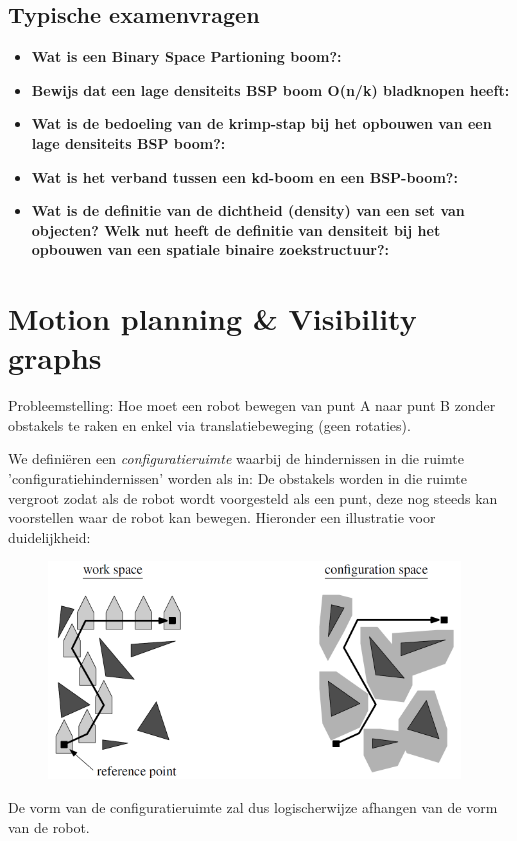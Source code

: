 \documentclass[12pt,a4paper]{article}
\begin{document}
	
	
	\subsection{Typische examenvragen}
	\begin{itemize}
		\item \textbf{Wat is een Binary Space Partioning boom?:}\\
		\item \textbf{Bewijs dat een lage densiteits BSP boom O(n/k) bladknopen heeft:}\\
		\item \textbf{Wat is de bedoeling van de krimp-stap bij het opbouwen van een lage densiteits BSP boom?:}\\
		\item \textbf{Wat is het verband tussen een kd-boom en een BSP-boom?:}\\
		\item \textbf{Wat is de definitie van de dichtheid (density) van een set van objecten? Welk nut heeft de definitie van densiteit bij het opbouwen van een spatiale binaire zoekstructuur?:}\\
	\end{itemize}
	
	
	\section{Motion planning \& Visibility graphs}
	Probleemstelling: Hoe moet een robot bewegen van punt A naar punt B zonder obstakels te raken en enkel via translatiebeweging (geen rotaties). 
	
	We definiëren een \textit{configuratieruimte} waarbij de hindernissen in die ruimte 'configuratiehindernissen' worden als in: De obstakels worden in die ruimte vergroot zodat als de robot wordt voorgesteld als een punt, deze nog steeds kan voorstellen waar de robot kan bewegen. Hieronder een illustratie voor duidelijkheid: 
	\begin{figure}[H]
		\centering
		\includegraphics[width=0.8\linewidth]{afbeeldingen/Motion-plannine/configuratieruimte}
		\label{fig:configuratieruimte}
	\end{figure}
	De vorm van de configuratieruimte zal dus logischerwijze afhangen van de vorm van de robot. 
	
\end{document}
